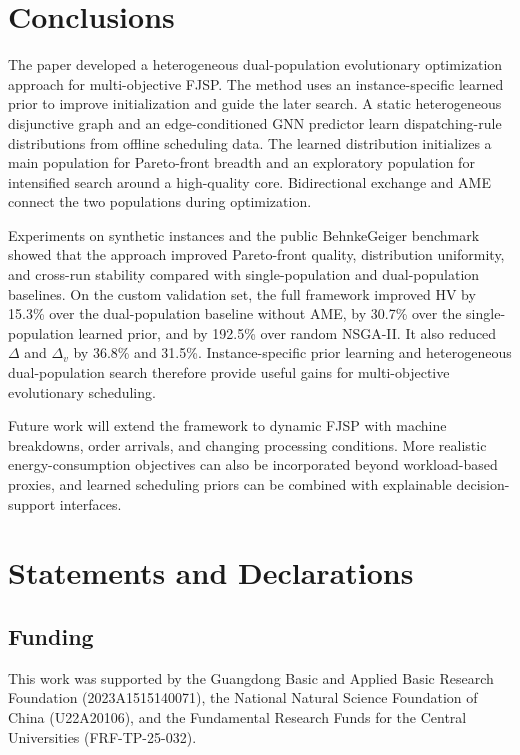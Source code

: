 \documentclass[pdflatex,iicol,Numbered,sn-basic]{sn-jnl}
\begin{document}
\section{Conclusions}\label{sec:conclusion}

The paper developed a heterogeneous dual-population evolutionary optimization approach for multi-objective FJSP. The method uses an instance-specific learned prior to improve initialization and guide the later search. A static heterogeneous disjunctive graph and an edge-conditioned GNN predictor learn dispatching-rule distributions from offline scheduling data. The learned distribution initializes a main population for Pareto-front breadth and an exploratory population for intensified search around a high-quality core. Bidirectional exchange and AME connect the two populations during optimization.

Experiments on synthetic instances and the public BehnkeGeiger benchmark showed that the approach improved Pareto-front quality, distribution uniformity, and cross-run stability compared with single-population and dual-population baselines. On the custom validation set, the full framework improved HV by 15.3\% over the dual-population baseline without AME, by 30.7\% over the single-population learned prior, and by 192.5\% over random NSGA-II. It also reduced $\Delta$ and $\Delta_v$ by 36.8\% and 31.5\%. Instance-specific prior learning and heterogeneous dual-population search therefore provide useful gains for multi-objective evolutionary scheduling.

Future work will extend the framework to dynamic FJSP with machine breakdowns, order arrivals, and changing processing conditions. More realistic energy-consumption objectives can also be incorporated beyond workload-based proxies, and learned scheduling priors can be combined with explainable decision-support interfaces.



\section*{Statements and Declarations}

\subsection*{Funding}

This work was supported by the Guangdong Basic and Applied Basic Research Foundation (2023A1515140071), the National Natural Science Foundation of China (U22A20106), and the Fundamental Research Funds for the Central Universities (FRF-TP-25-032).
\end{document}
